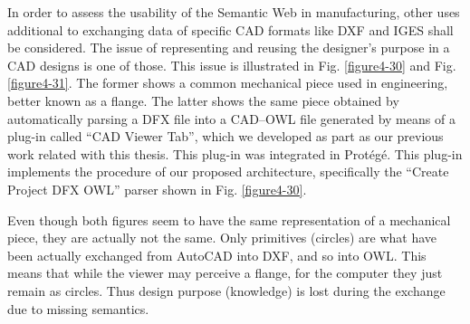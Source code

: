 In order to assess the usability of the Semantic Web in manufacturing, other uses additional to exchanging data of specific CAD formats like DXF and IGES shall be considered. \cpstart The issue of representing and reusing the designer’s purpose in a CAD designs is one of those\cpend. This issue is illustrated in Fig. \ref{figure4-30} and Fig. \ref{figure4-31}. The former shows a common mechanical piece used in engineering, better known as a flange. The latter shows the same piece obtained by automatically parsing a DFX file into a CAD–OWL file generated by means of a plug-in called “CAD Viewer Tab”, which we developed as part as our previous work related with this thesis. This plug-in was integrated in Protégé. This plug-in implements the procedure   of our proposed architecture, specifically the “Create Project DFX  OWL” parser shown in Fig. \ref{figure4-30}.

Even though both figures seem to have the same representation of a mechanical piece, they are actually not the same. Only primitives (circles) are what have been actually exchanged from AutoCAD into DXF, and so into OWL. This means that while the viewer may perceive a flange, for the computer they just remain as circles. Thus design purpose (knowledge) is lost during the exchange due to missing semantics.



